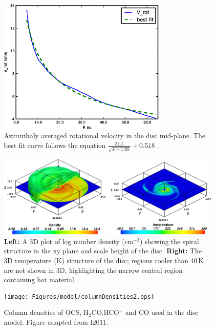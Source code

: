 \documentclass[useAMS,usenatbib]{mn2e}
\begin{document}
\begin{figure}
 \includegraphics[width=84mm]{Figures/model/rotational_velocities.eps}
 \caption{Azimuthaly averaged rotational velocity in the disc mid-plane. The best fit curve follows the equation $\frac{31.5}{\sqrt{x+1.68}}+0.518$ .}
 \label{velocity}
\end{figure}

\begin{figure}
 \includegraphics[width=168mm]{Figures/model/rhoT6.eps}
 \caption{{\bf Left:} A 3D plot of log number density (cm$^{-3}$) showing the spiral structure in the xy plane and scale height of the disc. {\bf Right:} The 3D temperature (K) structure of the disc; regions cooler than 40$\,$K are not shown in 3D, highlighting the narrow central region containing hot material.}
 \label{rhoT} 
\end{figure}

\begin{figure}
 \texttt{[image: Figures/model/columnDensities2.eps]}
 \caption{Column densities of OCS, H$_2$CO,HCO$^+$ and CO used in the disc model. Figure adapted from I2011.}
 \label{Chemistry} 
\end{figure}
\end{document}
